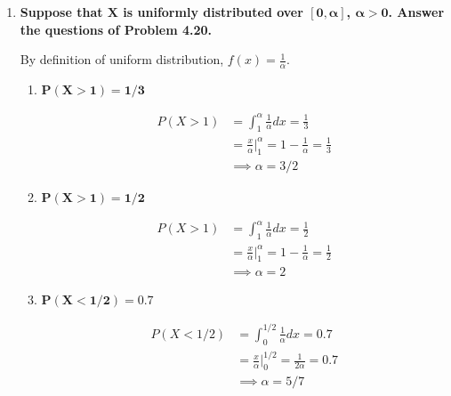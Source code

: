 \documentclass[10pt, oneside]{article}   	%
\theoremstyle{definition}
\begin{document}
\begin{enumerate}[label=4.\arabic*]
\begin{enumerate}
	\end{enumerate}
	
\item  \begin{tcolorbox}[
  colback=Cerulean!5!white,
  colframe=Cerulean!75!black]
\textbf{Suppose that $\bm{X}$ is uniformly distributed over $\bm{[0, \alpha]}$, $\bm{\alpha > 0}$. Answer the questions of Problem 4.20.}
\end{tcolorbox}

	By definition of uniform distribution, $f(x) = \frac{1}{\alpha}$.

	\begin{enumerate}
	\item  \begin{tcolorbox}[
	  colback=Cerulean!5!white,
	  colframe=Cerulean!75!black]
	\textbf{$\bm{P(X > 1) = 1/3}$}
	\end{tcolorbox}
	
	\begin{align*}
	P(X > 1) &= \int^\alpha_1 \frac{1}{\alpha} dx = \frac{1}{3} \\
	&= \frac{x}{\alpha} \Big|^\alpha_1 = 1 - \frac{1}{\alpha} = \frac{1}{3} \\
	&\implies \boxed{\alpha = 3/2}
	\end{align*}
	
	\item  \begin{tcolorbox}[
	  colback=Cerulean!5!white,
	  colframe=Cerulean!75!black]
	\textbf{$\bm{P(X > 1) = 1/2}$}
	\end{tcolorbox}
	
	\begin{align*}
	P(X > 1) &= \int^\alpha_1 \frac{1}{\alpha} dx = \frac{1}{2} \\
	&= \frac{x}{\alpha} \Big|^\alpha_1 = 1 - \frac{1}{\alpha} = \frac{1}{2} \\
	&\implies \boxed{\alpha = 2}
	\end{align*}
	
	\item  \begin{tcolorbox}[
	  colback=Cerulean!5!white,
	  colframe=Cerulean!75!black]
	\textbf{$\bm{P(X < 1/2) = 0.7}$}
	\end{tcolorbox}
	
	\begin{align*}
	P(X < 1/2) &= \int^{1/2}_{0} \frac{1}{\alpha} dx = 0.7 \\
	&= \frac{x}{\alpha} \Big|^{1/2}_{0} = \frac{1}{2\alpha} = 0.7 \\
	&\implies \boxed{\alpha = 5/7}
	\end{align*}
	

\end{enumerate}
\end{enumerate}
\end{document}
